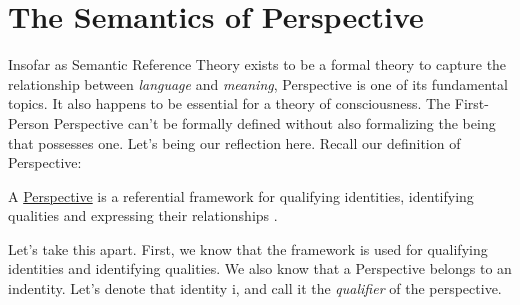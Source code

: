 \documentclass[runningheads]{llncs}
\begin{document}
\section{The Semantics of Perspective}

Insofar as Semantic Reference Theory exists to be a formal theory to capture the relationship between \emph{language} and \emph{meaning}, Perspective is one of its fundamental topics. It also happens to be essential for a theory of consciousness. The First-Person Perspective can't be formally defined without also formalizing the being that possesses one. Let's being our reflection here. Recall our definition of Perspective:

\setcounter{definition}{1}
\begin{sdefinition}
	A \href{https://github.com/DNA-Platform/inexplicable-phenomena/formalism/definitions/perspective.pdf}{Perspective} is a referential framework for qualifying identities, identifying qualities and expressing their relationships \cite{Formalism}.
\end{sdefinition}

Let's take this apart. First, we know that the framework is used for qualifying identities and identifying qualities. We also know that a Perspective belongs to an indentity. Let's denote that identity i, and call it the \emph{qualifier} of the perspective. 
\end{document}
